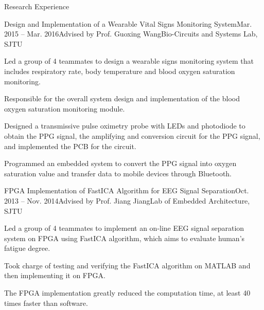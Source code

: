 \documentclass{resume_Stanford} %
\begin{document}
\begin{rSection}{Research Experience}
\begin{rSubsection}{Design and Implementation of a Wearable Vital Signs Monitoring System}{Mar. 2015 -- Mar. 2016}{Advised by Prof. Guoxing Wang}{Bio-Circuits and Systems Lab, SJTU}
\item Led a group of 4 teammates to design a wearable signs monitoring system that includes respiratory rate, body temperature and blood oxygen saturation monitoring. 
\item Responsible for the overall system design and implementation of the blood oxygen saturation monitoring module.
\item Designed a transmissive pulse oximetry probe with LEDs and photodiode to obtain the PPG signal, the amplifying and conversion circuit for the PPG signal, and implemented the PCB for the circuit. 
\item Programmed an embedded system to convert the PPG signal into oxygen saturation value and transfer data to mobile devices through Bluetooth.
\end{rSubsection}

\begin{rSubsection}{FPGA Implementation of FastICA Algorithm for EEG Signal Separation}{Oct. 2013 -- Nov. 2014}{Advised by Prof. Jiang Jiang}{Lab of Embedded Architecture, SJTU}
\item Led a group of 4 teammates to implement an on-line EEG signal separation system on FPGA using FastICA algorithm, which aims to evaluate human's fatigue degree.
\item Took charge of testing and verifying the FastICA algorithm on MATLAB and then implementing it on FPGA. 
\item The FPGA implementation greatly reduced the computation time, at least 40 times faster than software.
\end{rSubsection}

\end{rSection}
\end{document}

